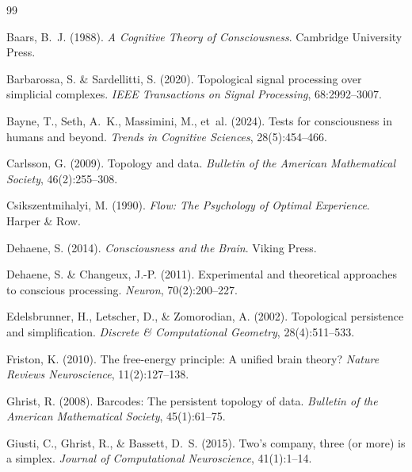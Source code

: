 \documentclass[11pt,a4paper]{article}
\begin{document}
\begin{thebibliography}{99}

Baars, B.~J. (1988).
\newblock \emph{A Cognitive Theory of Consciousness}.
\newblock Cambridge University Press.

Barbarossa, S. \& Sardellitti, S. (2020).
\newblock Topological signal processing over simplicial complexes.
\newblock \emph{IEEE Transactions on Signal Processing}, 68:2992--3007.

Bayne, T., Seth, A.~K., Massimini, M., et~al. (2024).
\newblock Tests for consciousness in humans and beyond.
\newblock \emph{Trends in Cognitive Sciences}, 28(5):454--466.

Carlsson, G. (2009).
\newblock Topology and data.
\newblock \emph{Bulletin of the American Mathematical Society}, 46(2):255--308.

Csikszentmihalyi, M. (1990).
\newblock \emph{Flow: The Psychology of Optimal Experience}.
\newblock Harper \& Row.

Dehaene, S. (2014).
\newblock \emph{Consciousness and the Brain}.
\newblock Viking Press.

Dehaene, S. \& Changeux, J.-P. (2011).
\newblock Experimental and theoretical approaches to conscious processing.
\newblock \emph{Neuron}, 70(2):200--227.

Edelsbrunner, H., Letscher, D., \& Zomorodian, A. (2002).
\newblock Topological persistence and simplification.
\newblock \emph{Discrete \& Computational Geometry}, 28(4):511--533.

Friston, K. (2010).
\newblock The free-energy principle: A unified brain theory?
\newblock \emph{Nature Reviews Neuroscience}, 11(2):127--138.

Ghrist, R. (2008).
\newblock Barcodes: The persistent topology of data.
\newblock \emph{Bulletin of the American Mathematical Society}, 45(1):61--75.

Giusti, C., Ghrist, R., \& Bassett, D.~S. (2015).
\newblock Two's company, three (or more) is a simplex.
\newblock \emph{Journal of Computational Neuroscience}, 41(1):1--14.


\end{thebibliography}
\end{document}
